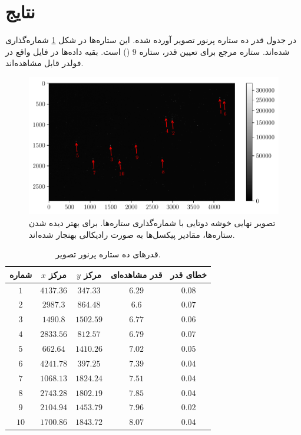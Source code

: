 \documentclass[12pt,a4paper]{article}
\begin{document}
	\section{نتایج}
	در جدول قدر ده ستاره پرنور تصویر آورده شده. این ستاره‌ها در شکل \ref{fig:cluster} شماره‌گذاری شده‌اند. ستاره مرجع
	برای تعیین قدر، ستاره $9$ () است. بقیه داده‌ها در فایل  واقع در فولدر
	 قابل مشاهده‌اند.
	\begin{figure}
		\centering
		\includegraphics[width=\linewidth]{../fig/cluster}
		\caption{تصویر نهایی خوشه دوتایی با شماره‌گذاری ستاره‌ها. برای بهتر دیده شدن ستاره‌ها، 
				مقادیر پیکسل‌ها به صورت رادیکالی بهنجار شده‌اند.}
		\label{fig:cluster}
	\end{figure}
	\begin{table}
		\centering
		\caption{قدرهای ده ستاره پرنور تصویر.}
		\begin{tabular}{|c|c|c|c|c|}
			\hline
			شماره & $x$ مرکز & $y$ مرکز & قدر مشاهده‌ای & خطای قدر \\ \hline
			$1$ & $4137.36$ & $347.33$ & $6.29$ & $0.08$ \\ \hline
			$2$ & $2987.3$ & $864.48$ & $6.6$ & $0.07$ \\ \hline
			$3$ & $1490.8$ & $1502.59$ & $6.77$ & $0.06$ \\ \hline
			$4$ & $2833.56$ & $812.57$ & $6.79$ & $0.07$ \\ \hline
			$5$ & $662.64$ & $1410.26$ & $7.02$ & $0.05$ \\ \hline
			$6$ & $4241.78$ & $397.25$ & $7.39$ & $0.04$ \\ \hline
			$7$ & $1068.13$ & $1824.24$ & $7.51$ & $0.04$ \\ \hline
			$8$ & $2743.28$ & $1802.19$ & $7.85$ & $0.04$ \\ \hline
			$9$ & $2104.94$ & $1453.79$ & $7.96$ & $0.02$ \\ \hline
			$10$ & $1700.86$ & $1843.72$ & $8.07$ & $0.04$ \\ \hline
		\end{tabular}
	\end{table}
\end{document}
